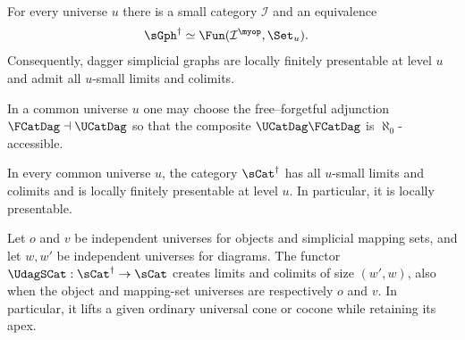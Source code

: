 \begin{resultblock}
\begin{theorem}
For every universe $u$ there is a small category $\mathcal I$ and an equivalence
\begin{align}
  \sGph^{\dag}
    &\simeq \Fun(\mathcal I^{\myop},\Set_u).
\end{align}
Consequently, dagger simplicial graphs are locally finitely presentable at level $u$ and admit all $u$-small limits and colimits.
\end{theorem}
\end{resultblock}

\begin{resultblock}
\begin{theorem}
In a common universe $u$ one may choose the free--forgetful adjunction $\FCatDag\dashv\UCatDag$ so that the composite $\UCatDag\FCatDag$ is $\aleph_0$-accessible.
\end{theorem}
\end{resultblock}

\begin{resultblock}
\begin{theorem}
In every common universe $u$, the category $\sCat^{\dag}$ has all $u$-small limits and colimits and is locally finitely presentable at level $u$.
In particular, it is locally presentable.
\end{theorem}
\end{resultblock}

\begin{resultblock}
\begin{theorem}
Let $o$ and $v$ be independent universes for objects and simplicial mapping sets, and let $w,w'$ be independent universes for diagrams.
The functor $\UdagSCat:\sCat^{\dag}\to\sCat$ creates limits and colimits of size $(w',w)$, also when the object and mapping-set universes are respectively $o$ and $v$.
In particular, it lifts a given ordinary universal cone or cocone while retaining its apex.
\end{theorem}
\end{resultblock}

